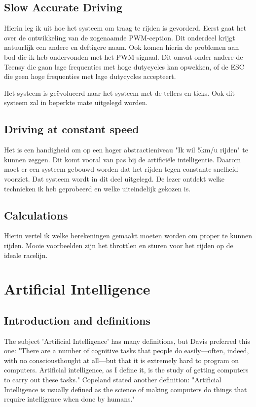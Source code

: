 \documentclass[conference,a4paper]{IEEEtran}
\begin{document}
\subsection{Slow Accurate Driving}
Hierin leg ik uit hoe het systeem om traag te rijden is gevorderd. Eerst gaat het over de ontwikkeling van de zogenaamde PWM-ception. Dit onderdeel krijgt natuurlijk een andere en deftigere naam. Ook komen hierin de problemen aan bod die ik heb ondervonden met het PWM-signaal. Dit omvat onder andere de Teensy die gaan lage frequenties met hoge dutycycles kan opwekken, of de ESC die geen hoge frequenties met lage dutycycles accepteert.

Het systeem is ge\"{e}volueerd naar het systeem met de tellers en ticks. Ook dit systeem zal in beperkte mate uitgelegd worden.

\subsection{Driving at constant speed}
Het is een handigheid om op een hoger abstractieniveau "Ik wil 5km/u rijden" te kunnen zeggen. Dit komt vooral van pas bij de artificiële intelligentie. Daarom moet er een systeem gebouwd worden dat het rijden tegen constante snelheid voorziet. Dat systeem wordt in dit deel uitgelegd. De lezer ontdekt welke technieken ik heb geprobeerd en welke uiteindelijk gekozen is.

\subsection{Calculations}
Hierin vertel ik welke berekeningen gemaakt moeten worden om proper te kunnen rijden. Mooie voorbeelden zijn het throttlen en sturen voor het rijden op de ideale racelijn.

\section{Artificial Intelligence}
\subsection{Introduction and definitions}
The subject 'Artificial Intelligence' has many definitions, but Davis preferred this one: "There are a number of cognitive tasks that people do easily---often, indeed, with no consciousthought at all---but that it is extremely hard to program on computers. Artificial intelligence, as I define it, is the study of getting computers to carry out these tasks."\cite{Davis2014} Copeland stated another definition: "Artificial Intelligence is usually defined as the science of making computers do things that require intelligence when done by humans." \cite{Cop2000}\\
\end{document}
